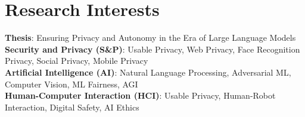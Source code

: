 \section{Research Interests}
 \begin{itemize}[leftmargin=0.5cm, label={}]
    \small{\item{
     \textbf{Thesis}{: Ensuring Privacy and Autonomy in the 
     Era of Large Language Models} \\
     \textbf{Security and Privacy (S\&P)}{: Usable Privacy, Web Privacy, Face Recognition Privacy, Social Privacy, Mobile Privacy} \\
     \textbf{Artificial Intelligence (AI)}{: Natural Language Processing, Adversarial ML, Computer Vision, ML Fairness, AGI} \\
     \textbf{Human-Computer Interaction (HCI)}{: Usable Privacy, Human-Robot Interaction, Digital Safety, AI Ethics} \\
    }}
 \end{itemize}